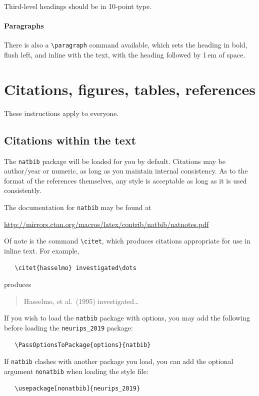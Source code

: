 \documentclass{article}
\begin{document}
Third-level headings should be in 10-point type.

\paragraph{Paragraphs}

There is also a \verb+\paragraph+ command available, which sets the heading in
bold, flush left, and inline with the text, with the heading followed by 1\,em
of space.

\section{Citations, figures, tables, references}
\label{others}

These instructions apply to everyone.

\subsection{Citations within the text}

The \verb+natbib+ package will be loaded for you by default.  Citations may be
author/year or numeric, as long as you maintain internal consistency.  As to the
format of the references themselves, any style is acceptable as long as it is
used consistently.

The documentation for \verb+natbib+ may be found at
\begin{center}
  \url{http://mirrors.ctan.org/macros/latex/contrib/natbib/natnotes.pdf}
\end{center}
Of note is the command \verb+\citet+, which produces citations appropriate for
use in inline text.  For example,
\begin{verbatim}
   \citet{hasselmo} investigated\dots
\end{verbatim}
produces
\begin{quote}
  Hasselmo, et al.\ (1995) investigated\dots
\end{quote}

If you wish to load the \verb+natbib+ package with options, you may add the
following before loading the \verb+neurips_2019+ package:
\begin{verbatim}
   \PassOptionsToPackage{options}{natbib}
\end{verbatim}

If \verb+natbib+ clashes with another package you load, you can add the optional
argument \verb+nonatbib+ when loading the style file:
\begin{verbatim}
   \usepackage[nonatbib]{neurips_2019}
\end{verbatim}
\end{document}
